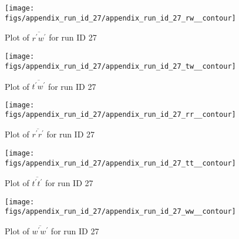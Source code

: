 \begin{figure}[H]
\centering
\texttt{[image: figs/appendix\_run\_id\_27/appendix\_run\_id\_27\_rw\_\_contour]}
\caption{Plot of $\overline{r^\prime w^\prime}$ for run ID 27}
\label{fig:appendix_run_id_27_rw__contour}
\end{figure}


\begin{figure}[H]
\centering
\texttt{[image: figs/appendix\_run\_id\_27/appendix\_run\_id\_27\_tw\_\_contour]}
\caption{Plot of $\overline{t^\prime w^\prime}$ for run ID 27}
\label{fig:appendix_run_id_27_tw__contour}
\end{figure}


\begin{figure}[H]
\centering
\texttt{[image: figs/appendix\_run\_id\_27/appendix\_run\_id\_27\_rr\_\_contour]}
\caption{Plot of $\overline{r^\prime r^\prime}$ for run ID 27}
\label{fig:appendix_run_id_27_rr__contour}
\end{figure}


\begin{figure}[H]
\centering
\texttt{[image: figs/appendix\_run\_id\_27/appendix\_run\_id\_27\_tt\_\_contour]}
\caption{Plot of $\overline{t^\prime t^\prime}$ for run ID 27}
\label{fig:appendix_run_id_27_tt__contour}
\end{figure}


\begin{figure}[H]
\centering
\texttt{[image: figs/appendix\_run\_id\_27/appendix\_run\_id\_27\_ww\_\_contour]}
\caption{Plot of $\overline{w^\prime w^\prime}$ for run ID 27}
\label{fig:appendix_run_id_27_ww__contour}
\end{figure}


